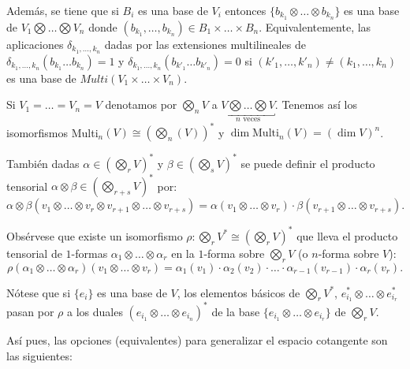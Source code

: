 \documentclass[../VD.tex]{subfiles}
\begin{document}
\begin{remark}
  Además, se tiene que si \(B_{i}\) es una base de \(V_{i}\) entonces
  \(\{b_{k_{1}}\otimes\dots\otimes b_{k_{n}}\}\) es una base de
  \(V_{1}\bigotimes\dots\bigotimes V_{n}\) donde
  \((b_{k_{1}},\dots,b_{k_{n}})\in B_{1}\times\dots\times B_{n}\).
  Equivalentemente, las aplicaciones \(\delta_{k_{1},\dots,k_{n}}\) dadas por las
  extensiones multilineales de \(\delta_{k_{1},\dots,k_{n}}(b_{k_{1}}\dots
  b_{k_{n}})=1\) y \(\delta_{k_{1},\dots,k_{n}}(b_{k'_{1}}\dots b_{k'_{n}})=0\)
  si \((k'_{1},\dots,k'_{n})\neq(k_{1},\dots,k_{n})\) es una base de 
  \(Multi(V_{1}\times\dots\times V_{n})\).

  Si \(V_{1}=\dots=V_{n}=V\) denotamos por \(\bigotimes_{n}V\) a
    \(\underbracket{V\bigotimes\dots\bigotimes V}_{n\text{ veces}}\). 
    Tenemos así los isomorfismos  Multi\(_{n}(V)\cong(\bigotimes_{n}(V))^{*}\) y
  \(\dim{\text{Multi}_{n}(V)}=(\dim{V})^{n}\).

  También dadas \(\alpha\in(\bigotimes_{r}V)^{*}\) y
  \(\beta\in(\bigotimes_{s}V)^{*}\) se puede definir el producto tensorial
  \(\alpha\otimes\beta\in(\bigotimes_{r+s}V)^{*}\) por:
  \[
    \alpha\otimes\beta(v_{1}\otimes\dots\otimes v_{r}\otimes
    v_{r+1}\otimes\dots\otimes v_{r+s})=\alpha(v_{1}\otimes\dots\otimes
    v_{r})\cdot \beta(v_{r+1}\otimes\dots\otimes v_{r+s}).
  \]

  Obsérvese que existe un isomorfismo
  \(\rho\colon\bigotimes_{r}V^*\cong(\bigotimes_{r}V)^{*}\) que lleva el producto
  tensorial de \(1\)-formas \(\alpha_{1}\otimes\dots\otimes\alpha_{r}\) en la
  \(1\)-forma sobre \(\bigotimes_{r}V\) (o \(n\)-forma sobre \(V\)):
  \[
    \rho(\alpha_{1}\otimes\dots\otimes\alpha_{r})(v_{1}\otimes\dots\otimes
    v_{r})=\alpha_{1}(v_{1})\cdot \alpha_2(v_2) \cdot \dots \cdot \alpha_{r-1}(v_{r-1}) \cdot \alpha_{r}(v_{r}).
  \]

  Nótese que si \(\{e_{i}\}\) es una base de \(V\), los elementos básicos de
  \(\bigotimes_{r}V^{*}\), \(e_{i_{1}}^{*}\otimes\dots\otimes e_{i_{r}}^{*}\)
  pasan por \(\rho\) a los duales \((e_{i_{1}}\otimes\dots\otimes
  e_{i_{n}})^{*}\) de la base \(\{e_{i_{1}}\otimes\dots\otimes e_{i_{r}}\}\) de
  \(\bigotimes_{r}V\).
\end{remark}

Así pues, las opciones (equivalentes) para generalizar el espacio cotangente son
las siguientes:
\end{document}
